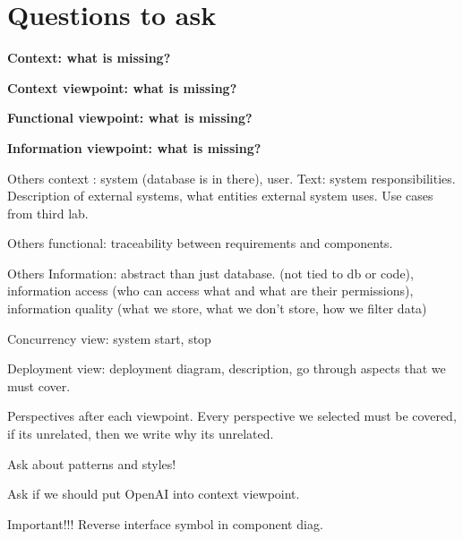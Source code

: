 \documentclass[a4paper,12pt]{article}
\begin{document}
\tableofcontents
\newpage

\section{Questions to ask}

\textbf{Context: what is missing?}

\textbf{Context viewpoint: what is missing?}

\textbf{Functional viewpoint: what is missing?}

\textbf{Information viewpoint: what is missing?}

Others context : system (database is in there), user. Text: system responsibilities. Description of external systems, what entities external system uses. Use cases from third lab.

Others functional: traceability between requirements and components.

Others Information: abstract than just database. (not tied to db or code), information access (who can access what and what are their permissions), information quality (what we store, what we don't store, how we filter data)

Concurrency view: system start, stop

Deployment view: deployment diagram, description, go through aspects that we must cover.

Perspectives after each viewpoint. Every perspective we selected must be covered, if its unrelated, then we write why its unrelated.

Ask about patterns and styles!

Ask if we should put OpenAI into context viewpoint.

Important!!! Reverse interface symbol in component diag.







\listoffigures
\end{document}
